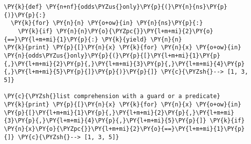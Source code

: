 \begin{Verbatim}[commandchars=\\\{\}]
\PY{k}{def} \PY{n+nf}{odds\PYZus{}only}\PY{p}{(}\PY{n}{ns}\PY{p}{)}\PY{p}{:}
  \PY{k}{for} \PY{n}{n} \PY{o+ow}{in} \PY{n}{ns}\PY{p}{:}
    \PY{k}{if} \PY{n}{n}\PY{o}{\PYZpc{}}\PY{l+m+mi}{2}\PY{o}{==}\PY{l+m+mi}{1}\PY{p}{:} \PY{k}{yield} \PY{n}{n}
\PY{k}{print} \PY{p}{[}\PY{n}{x} \PY{k}{for} \PY{n}{x} \PY{o+ow}{in} \PY{n}{odds\PYZus{}only}\PY{p}{(}\PY{p}{[}\PY{l+m+mi}{1}\PY{p}{,}\PY{l+m+mi}{2}\PY{p}{,}\PY{l+m+mi}{3}\PY{p}{,}\PY{l+m+mi}{4}\PY{p}{,}\PY{l+m+mi}{5}\PY{p}{]}\PY{p}{)}\PY{p}{]} \PY{c}{\PYZsh{}--> [1, 3, 5]}

\PY{c}{\PYZsh{}list comprehension with a guard or a predicate}
\PY{k}{print} \PY{p}{[}\PY{n}{x} \PY{k}{for} \PY{n}{x} \PY{o+ow}{in} \PY{p}{[}\PY{l+m+mi}{1}\PY{p}{,}\PY{l+m+mi}{2}\PY{p}{,}\PY{l+m+mi}{3}\PY{p}{,}\PY{l+m+mi}{4}\PY{p}{,}\PY{l+m+mi}{5}\PY{p}{]} \PY{k}{if} \PY{n}{x}\PY{o}{\PYZpc{}}\PY{l+m+mi}{2}\PY{o}{==}\PY{l+m+mi}{1}\PY{p}{]} \PY{c}{\PYZsh{}--> [1, 3, 5]}
\end{Verbatim}
